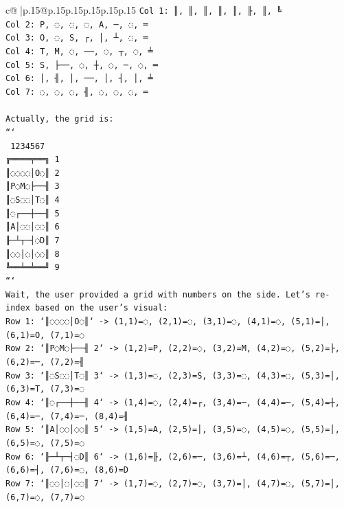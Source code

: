\documentclass{article}
\begin{document}
{\begin{supertabular}{c@{$\;$}|p{.15\linewidth}@{}p{.15\linewidth}p{.15\linewidth}p{.15\linewidth}p{.15\linewidth}p{.15\linewidth}}
{{{\texttt{Col 1: ║, ║, ║, ║, ║, ╟, ║, ╚} \\
\texttt{Col 2: P, ◌, ◌, ◌, A, ─, ◌, ═} \\
\texttt{Col 3: O, ◌, S, ┌, │, ┴, ◌, ═} \\
\texttt{Col 4: T, M, ◌, ──, ◌, ┬, ◌, ╧} \\
\texttt{Col 5: S, ├──, ◌, ┼, ◌, ─, ◌, ═} \\
\texttt{Col 6: │, ╢, │, ──, │, ┤, │, ╧} \\
\texttt{Col 7: ◌, ◌, ◌, ╢, ◌, ◌, ◌, ═} \\
\\ 
\texttt{Actually, the grid is:} \\
\texttt{```} \\
\texttt{ 1234567} \\
\texttt{╔════╤══╗ 1} \\
\texttt{║◌◌◌◌│O◌║ 2} \\
\texttt{║P◌M◌├──╢ 3} \\
\texttt{║◌S◌◌│T◌║ 4} \\
\texttt{║◌┌──┼──╢ 5} \\
\texttt{║A│◌◌│◌◌║ 6} \\
\texttt{╟─┴┬─┤◌D║ 7} \\
\texttt{║◌◌│◌│◌◌║ 8} \\
\texttt{╚══╧═╧══╝ 9} \\
\texttt{```} \\
\texttt{Wait, the user provided a grid with numbers on the side. Let's re{-}index based on the user's visual:} \\
\texttt{Row 1: `║◌◌◌◌│O◌║` {-}> (1,1)=◌, (2,1)=◌, (3,1)=◌, (4,1)=◌, (5,1)=│, (6,1)=O, (7,1)=◌} \\
\texttt{Row 2: `║P◌M◌├──╢ 2` {-}> (1,2)=P, (2,2)=◌, (3,2)=M, (4,2)=◌, (5,2)=├, (6,2)=─, (7,2)=╢} \\
\texttt{Row 3: `║◌S◌◌│T◌║ 3` {-}> (1,3)=◌, (2,3)=S, (3,3)=◌, (4,3)=◌, (5,3)=│, (6,3)=T, (7,3)=◌} \\
\texttt{Row 4: `║◌┌──┼──╢ 4` {-}> (1,4)=◌, (2,4)=┌, (3,4)=─, (4,4)=─, (5,4)=┼, (6,4)=─, (7,4)=─, (8,4)=╢} \\
\texttt{Row 5: `║A│◌◌│◌◌║ 5` {-}> (1,5)=A, (2,5)=│, (3,5)=◌, (4,5)=◌, (5,5)=│, (6,5)=◌, (7,5)=◌} \\
\texttt{Row 6: `╟─┴┬─┤◌D║ 6` {-}> (1,6)=╟, (2,6)=─, (3,6)=┴, (4,6)=┬, (5,6)=─, (6,6)=┤, (7,6)=◌, (8,6)=D} \\
\texttt{Row 7: `║◌◌│◌│◌◌║ 7` {-}> (1,7)=◌, (2,7)=◌, (3,7)=│, (4,7)=◌, (5,7)=│, (6,7)=◌, (7,7)=◌} \\
\\ 
}}}
\end{supertabular}}
\end{document}
